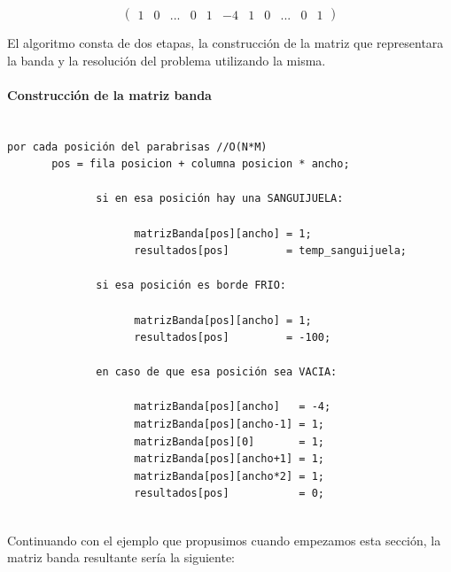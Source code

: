 \[ \left( \begin{array}{ccccccccccc}
1 & 0 & ... & 0 & 1 & -4 & 1 & 0  & ... & 0 & 1\end{array} 
\right)\] 

El algoritmo consta de dos etapas, la construcción de la matriz que representara la banda y la resolución del problema utilizando la misma.

\paragraph{Construcción de la matriz banda}
\begin{verbatim}

por cada posición del parabrisas //O(N*M)
       pos = fila posicion + columna posicion * ancho;
		
              si en esa posición hay una SANGUIJUELA:
			
                    matrizBanda[pos][ancho] = 1;
                    resultados[pos]         = temp_sanguijuela;
		
              si esa posición es borde FRIO:
                    
                    matrizBanda[pos][ancho] = 1;
                    resultados[pos]         = -100;

              en caso de que esa posición sea VACIA:
                    
                    matrizBanda[pos][ancho]   = -4;
                    matrizBanda[pos][ancho-1] = 1;
                    matrizBanda[pos][0]       = 1;
                    matrizBanda[pos][ancho+1] = 1;
                    matrizBanda[pos][ancho*2] = 1;
                    resultados[pos]           = 0; 
		

\end{verbatim}

Continuando con el ejemplo que propusimos cuando empezamos esta sección, la matriz banda resultante sería la siguiente:

